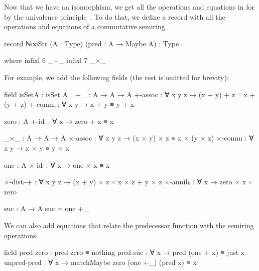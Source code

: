 Now that we have an isomorphism, we get all the operations and equations in
 for  by the univalence
principle~\cite{hottbook}. To do that, we define a record with all the
operations and equations of a commutative semiring.
\begin{AgdaAlign}
\begin{code}
record ℕ∞Str (A : Type) (pred : A → Maybe A) : Type
\end{code}
\begin{code}[hide]
  where
  infixl 6 _+_
  infixl 7 _×_
\end{code}
For example, we add the following fields (the rest is omitted for brevity):
\begin{code}
  field
    isSetA   : isSet A
    _+_      : A → A → A
    +-assoc  : ∀ x y z → (x + y) + z ≡ x + (y + z)
    +-comm   : ∀ x y → x + y ≡ y + x
\end{code}
\begin{code}[hide]
    zero : A
    +-idₗ : ∀ x → zero + x ≡ x

    _×_ : A → A → A
    ×-assoc : ∀ x y z → (x × y) × z ≡ x × (y × z)
    ×-comm : ∀ x y → x × y ≡ y × x

    one : A
    ×-idₗ : ∀ x → one × x ≡ x

    ×-distₗ-+ : ∀ x y z → (x + y) × z ≡ x × z + y × z
    ×-annihₗ : ∀ x → zero × x ≡ zero

  suc : A → A
  suc = one +_
\end{code}
We can also add equations that relate the predecessor function with the semiring
operations.
\begin{code}
  field
    pred-zero    : pred zero ≡ nothing
    pred-suc     : ∀ x → pred (one + x) ≡ just x
    unpred-pred  :
      ∀ x → matchMaybe zero (one +_) (pred x) ≡ x
\end{code}
\end{AgdaAlign}

